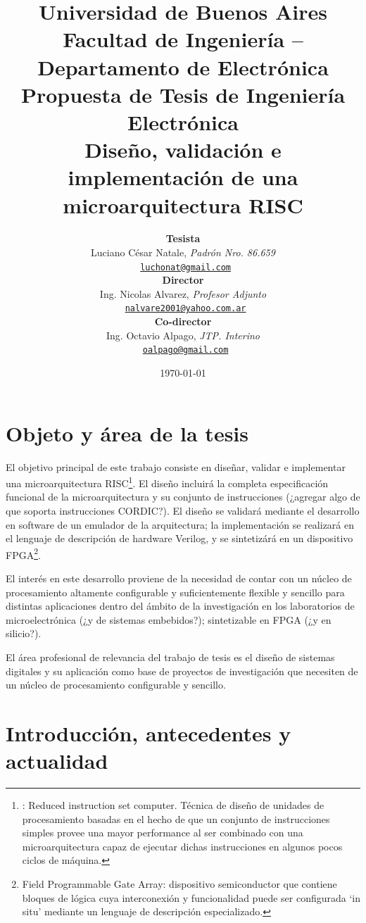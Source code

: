 \documentclass[a4paper]{article}
\title{
	{\normalsize
		Universidad de Buenos Aires\\
		Facultad de Ingeniería -- Departamento de Electrónica\\
		Propuesta de Tesis de Ingeniería Electrónica\\
		\vspace{0.7cm}
	}
	Diseño, validación e implementación de una microarquitectura RISC
}
\author{	\textbf{Tesista}															\\
			Luciano César Natale, \textit{Padrón Nro. 86.659}               			\\
            \texttt{ \href{mailto:luchonat@gmail.com}{luchonat@gmail.com}}			\\[2.5ex]
            \textbf{Director}																\\
            Ing. Nicolas Alvarez, \textit{Profesor Adjunto}             				\\
            \texttt{ \href{mailto:nalvare2001@yahoo.com.ar}{nalvare2001@yahoo.com.ar}}  \\[2.5ex]
            \textbf{Co-director}															\\
            Ing. Octavio Alpago, \textit{JTP. Interino}               					\\
            \texttt{ \href{mailto:oalpago@gmail.com}{oalpago@gmail.com}}                \\[2.5ex]
       }
\date{\today}
\begin{document}
\maketitle



\thispagestyle{fancy}

\section{Objeto y área de la tesis}

El objetivo principal de este trabajo consiste en diseñar, validar e implementar una microarquitectura RISC\footnote{\label{RISC}: Reduced instruction set computer. Técnica de diseño de unidades de procesamiento basadas en el hecho de que un conjunto de instrucciones simples provee una mayor performance al ser combinado con una microarquitectura capaz de ejecutar dichas instrucciones en algunos pocos ciclos de máquina.}. El diseño incluirá la completa especificación funcional de la microarquitectura y su conjunto de instrucciones (¿agregar algo de que soporta instrucciones CORDIC?). El diseño se validará mediante el desarrollo en software de un emulador de la arquitectura; la implementación se realizará en el lenguaje de descripción de hardware Verilog, y se sintetizárá en un dispositivo FPGA\footnote{\label{FPGA}Field Programmable Gate Array: dispositivo semiconductor que contiene bloques de lógica cuya interconexión y funcionalidad puede ser configurada `in situ' mediante un lenguaje de descripción especializado.}.

El interés en este desarrollo proviene de la necesidad de contar con un núcleo de procesamiento altamente configurable y suficientemente flexible y sencillo para distintas aplicaciones dentro del ámbito de la investigación en los laboratorios de microelectrónica (¿y de sistemas embebidos?); sintetizable en FPGA
(¿y en silicio?).

El área profesional de relevancia del trabajo de tesis es el diseño de sistemas digitales y su aplicación como base de proyectos de investigación que necesiten de un núcleo de procesamiento configurable y sencillo.

\newpage

\section{Introducción, antecedentes y actualidad}
\end{document}
